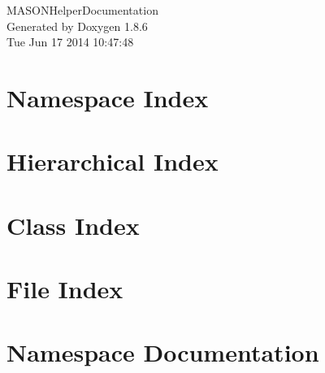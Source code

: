 \documentclass[twoside]{book}
\newcommand{\clearemptydoublepage}{%
  \newpage{\pagestyle{empty}\cleardoublepage}%
}
\begin{document}
\hypersetup{pageanchor=false}
\begin{titlepage}
\vspace*{7cm}
\begin{center}%
{\Large M\-A\-S\-O\-N\-Helper\-Documentation }\\
\vspace*{1cm}
{\large Generated by Doxygen 1.8.6}\\
\vspace*{0.5cm}
{\small Tue Jun 17 2014 10:47:48}\\
\end{center}
\end{titlepage}
\clearemptydoublepage
\tableofcontents
\clearemptydoublepage
{}
\hypersetup{pageanchor=true}

\chapter{Namespace Index}

\chapter{Hierarchical Index}

\chapter{Class Index}

\chapter{File Index}

\chapter{Namespace Documentation}














\end{document}
